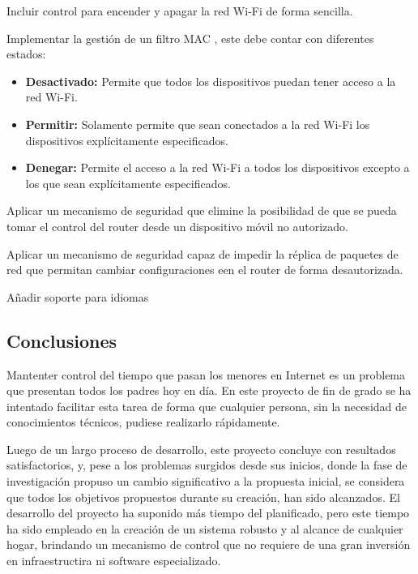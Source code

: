 \documentclass[12pt]{article}
\begin{document}
        \item Incluir control para encender y apagar la red Wi-Fi de forma sencilla.
        \item Implementar la gestión de un filtro MAC , este debe contar con diferentes estados:
            \begin{itemize}
                \item \textbf{Desactivado:} Permite que todos los dispositivos puedan tener acceso a la red Wi-Fi.
                \item \textbf{Permitir:} Solamente permite que sean conectados a la red Wi-Fi los dispositivos explícitamente especificados. 
                \item \textbf{Denegar:} Permite el acceso a la red Wi-Fi a todos los dispositivos excepto a los que sean explícitamente especificados.
            \end{itemize}
        \item Aplicar un mecanismo de seguridad que elimine la posibilidad de que se pueda tomar el control del router desde un dispositivo móvil no autorizado.
        \item Aplicar un mecanismo de seguridad capaz de impedir la réplica de paquetes de red que permitan cambiar configuraciones een el router de forma desautorizada.
        \item Añadir soporte para idiomas


    \subsection{Conclusiones}
    Mantenter control del tiempo que pasan los menores en Internet es un problema que presentan todos los padres hoy en día. En este proyecto de fin de grado se ha intentado facilitar esta tarea de forma que cualquier persona, sin la necesidad de conocimientos técnicos, pudiese realizarlo rápidamente. 
    
    Luego de un largo proceso de desarrollo, este proyecto concluye con resultados satisfactorios, y, pese a los problemas surgidos desde sus inicios, donde la fase de investigación propuso un cambio significativo a la propuesta inicial, se considera que todos los objetivos propuestos durante su creación, han sido alcanzados. El desarrollo del proyecto ha suponido más tiempo del planificado, pero este tiempo ha sido empleado en la creación de un sistema robusto y al alcance de cualquier hogar, brindando un mecanismo de control que no requiere de una gran inversión en infraestructira ni software especializado.
\end{document}
